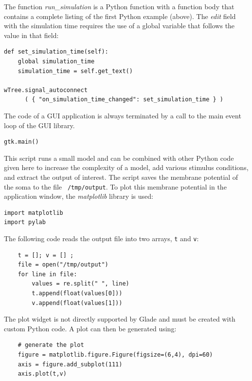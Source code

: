 \documentclass[12pt]{article}
\begin{document}
{The function {\it run\_simulation} is a Python function with a
function body that contains a complete listing of the first Python
example (above). The {\it edit} field with the simulation time
requires the use of a global variable that follows the value in that
field:

{\footnotesize
  \resetlinenumber[8]
  \linenumbers
\begin{verbatim}
def set_simulation_time(self):
    global simulation_time
    simulation_time = self.get_text()
    
wTree.signal_autoconnect
      ( { "on_simulation_time_changed": set_simulation_time } )
\end{verbatim}
}

The code of a GUI application is always terminated by a call to the
main event loop of the GUI library.

{\footnotesize
  \resetlinenumber[14]
  \linenumbers
\begin{verbatim}
gtk.main()
\end{verbatim}
}

This script runs a small model and can be combined with other Python
code given here to increase the complexity of a model, add various
stimulus conditions, and extract the output of interest.  The script
saves the membrane potential of the soma to the file {\tt
  /tmp/output}.  To plot this membrane potential in the application
window, the {\it matplotlib} library is used:

{\footnotesize
  \resetlinenumber[5]
\begin{verbatim}
import matplotlib
import pylab
\end{verbatim}
}

The following code reads the output file into two arrays, {\tt t} and
{\tt v}:

{\footnotesize
  \resetlinenumber[5]
\begin{verbatim}
    t = []; v = [] ;
    file = open("/tmp/output")
    for line in file:
        values = re.split(" ", line)
        t.append(float(values[0]))
        v.append(float(values[1]))
\end{verbatim}
}

The plot widget is not directly supported by Glade and must be created
with custom Python code.  A plot can then be generated using:

{\footnotesize
  \resetlinenumber[5]
\begin{verbatim}
    # generate the plot
    figure = matplotlib.figure.Figure(figsize=(6,4), dpi=60)
    axis = figure.add_subplot(111)
    axis.plot(t,v)


\end{verbatim}}}
\end{document}
